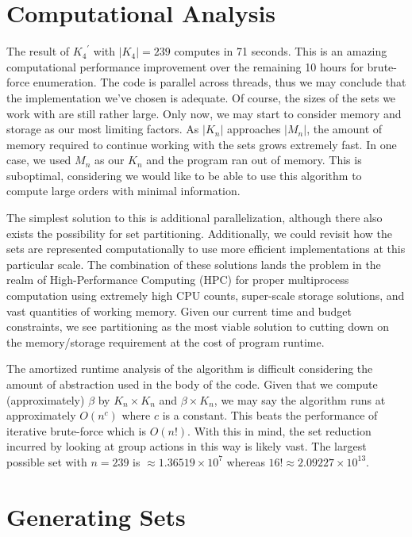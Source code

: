 \documentclass[12pt]{report}
\begin{document}
\section{Computational Analysis}

\par The result of ${K_4}^\prime$ with $\left|K_4\right|=239$ computes in 71 seconds. This is an
amazing computational performance improvement over the remaining 10 hours for brute-force
enumeration. The code is parallel across threads, thus we may conclude that the implementation
we've chosen is adequate. Of course, the sizes of the sets we work with are still rather large.
Only now, we may start to consider memory and storage as our most limiting factors. As
$\left|K_n\right|$ approaches $\left|M_n\right|$, the amount of memory required to continue working
with the sets grows extremely fast. In one case, we used $M_n$ as our $K_n$ and the program ran out
of memory. This is suboptimal, considering we would like to be able to use this algorithm to
compute large orders with minimal information.

\par The simplest solution to this is additional parallelization, although there also exists the
possibility for set partitioning. Additionally, we could revisit how the sets are represented
computationally to use more efficient implementations at this particular scale. The combination of
these solutions lands the problem in the realm of High-Performance Computing (HPC) for proper
multiprocess computation using extremely high CPU counts, super-scale storage solutions, and vast
quantities of working memory. Given our current time and budget constraints, we see partitioning as
the most viable solution to cutting down on the memory/storage requirement at the cost of program
runtime.

\par The amortized runtime analysis of the algorithm is difficult considering the amount of
abstraction used in the body of the code. Given that we compute (approximately) $\beta$ by $K_n
  \times K_n$ and $\beta \times K_n$, we may say the algorithm runs at approximately
$O\left(n^c\right)$ where $c$ is a constant. This beats the performance of iterative brute-force
which is $O\left(n!\right)$. With this in mind, the set reduction incurred by looking at group
actions in this way is likely vast. The largest possible set with $n=239$ is $\approx 1.36519
  \times 10^7$ whereas $16!\approx 2.09227 \times 10^{13}$.

\section{Generating Sets}
\end{document}
